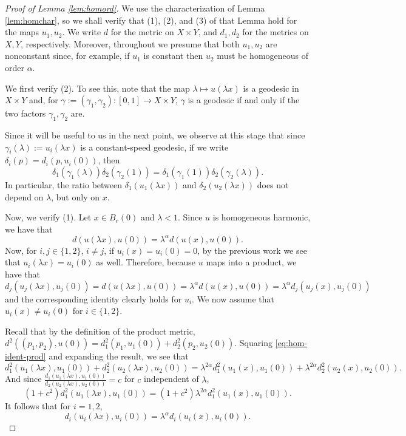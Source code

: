 \documentclass[12pt]{amsart}
\theoremstyle{definition}
\numberwithin{equation}{section}
\begin{document}
\begin{proof}[Proof of Lemma \ref{lem:homord}]
We use the characterization of Lemma \ref{lem:homchar}, so we shall verify that (1), (2), and (3) of that Lemma hold for the maps $u_1,u_2$.  We write $d$ for the metric on $X\times Y$, and $d_1,d_2$ for the metrics on $X,Y$, respectively. Moreover, throughout we presume that both $u_1, u_2$ are nonconstant since, for example, if $u_1$ is constant then $u_2$ must be homogeneous of order $\alpha$.


We first verify (2). 
 To see this, note that the map $\lambda\mapsto u(\lambda x)$ is a geodesic in $X \times Y$ and, for $\gamma:=(\gamma_1,\gamma_2):[0,1]\to X\times Y$, $\gamma$ is a geodesic if and only if the two factors $\gamma_1,\gamma_2$ are.

Since it will be useful to us in the next point, we observe at this stage that since $\gamma_i(\lambda):= u_i(\lambda x)$ is a constant-speed geodesic, if we write $\delta_i(p)=d_i(p,u_i(0))$, then 
\[
\delta_1(\gamma_1(\lambda))\delta_2(\gamma_2(1))=\delta_1(\gamma_1(1))\delta_2(\gamma_2(\lambda)).
\]
In particular, the ratio between $\delta_1(u_1(\lambda x))$ and $\delta_2(u_2(\lambda x))$ does not depend on $\lambda$, but only on $x$.

Now, we verify (1).  Let $x\in B_r(0)$ and $\lambda<1$.  Since $u$ is homogeneous harmonic, we have that
\begin{equation}\label{eq:hom-ident-prod}
d(u(\lambda x),u(0))=\lambda^\alpha d(u(x),u(0)).
\end{equation}
Now, for $i,j \in \{1,2\}$, $i \neq j$, if  $u_i(x)=u_i(0)=0$, by the previous work we see that $u_i(\lambda x)=u_i(0)$ as well.  Therefore, because $u$ maps into a product, we have that
\[
d_j(u_j(\lambda x),u_{j}(0))=d(u(\lambda x),u(0))=\lambda^\alpha d(u(x),u(0))=\lambda^\alpha d_{j}(u_{j}( x),u_{j}(0))
\]
and the corresponding identity clearly holds for $u_i$. We now assume that $u_i(x)\neq u_i(0)$ for $i \in \{1,2\}$.  

Recall that by the definition of the product metric, $d^2((p_1,p_2),u(0))=d^2_1(p_1,u_1(0))+d_2^2(p_2,u_2(0))$.  Squaring \eqref{eq:hom-ident-prod} and expanding the result, we see that
\[
d^2_1(u_1(\lambda x),u_1(0))+d_2^2(u_2(\lambda x),u_2(0))=\lambda^{2\alpha}d^2_1(u_1(x),u_1(0))+\lambda^{2\alpha}d^2_2(u_2(x),u_2(0)).
\]
And since $\frac{d_1(u_1(\lambda x),u_1(0))}{d_2(u_2(\lambda x),u_2(0))}=c$ for $c$ independent of $\lambda$, 
\[
(1+c^2)d_1^2(u_1(\lambda x),u_1(0))=(1+c^2)\lambda^{2\alpha}d_1^2(u_1(x),u_1(0)).
\]
It follows that for $i=1,2$,
\begin{equation}\label{eq:hom-ident-con}
d_i(u_i(\lambda x),u_i(0))=\lambda^\alpha d_i(u_i(x),u_i(0)).
\end{equation}


\end{proof}
\end{document}
